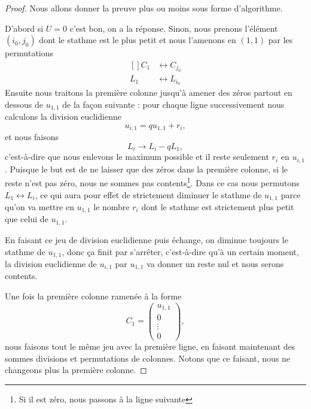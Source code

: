 \begin{proof}
	Nous allons donner la preuve plus ou moins sous forme d'algorithme.

	D'abord si \( U=0\) c'est bon, on a la réponse. Sinon, nous prenons l'élément \( (i_0,j_0)\) dont le stathme est le plus petit et nous l'amenons en \( (1,1)\) par les permutations
	\begin{equation}
		\begin{aligned}[]
			C_1 & \leftrightarrow C_{j_0} \\
			L_1 & \leftrightarrow L_{i_0}
		\end{aligned}
	\end{equation}
	Ensuite nous traitons la première colonne jusqu'à amener des zéros partout en dessous de \( u_{1,1}\) de la façon suivante : pour chaque ligne successivement nous calculons la division euclidienne
	\begin{equation}
		u_{i,1}=qu_{1,1}+r_i,
	\end{equation}
	et nous faisons
	\begin{equation}
		L_i\to L_i-qL_1,
	\end{equation}
	c'est-à-dire que nous enlevons le maximum possible et il reste seulement \( r_i\) en \( u_{i,1}\). Puisque le but est de ne laisser que des zéros dans la première colonne, si le reste n'est pas zéro, nous ne sommes pas contents\footnote{Si il est zéro, nous passons à la ligne suivante}. Dans ce cas nous permutons \( L_1\leftrightarrow L_i\), ce qui aura pour effet de strictement diminuer le stathme de \( u_{1,1}\) parce qu'on va mettre en \( u_{1,1}\) le nombre \( r_i\) dont le stathme est strictement plus petit que celui de \( u_{1,1}\).

	En faisant ce jeu de division euclidienne puis échange, on diminue toujours le stathme de \( u_{1,1}\), donc ça finit par s'arrêter, c'est-à-dire qu'à un certain moment, la division euclidienne de \( u_{i,1}\) par \( u_{1,1}\) va donner un reste nul et nous serons contents.

	Une fois la première colonne ramenée à la forme
	\begin{equation}
		C_1=\begin{pmatrix}
			u_{1,1} \\
			0      \\
			\vdots \\
			0
		\end{pmatrix},
	\end{equation}
	nous faisons tout le même jeu avec la première ligne, en faisant maintenant des sommes divisions et permutations de colonnes. Notons que ce faisant, nous ne changeons plus la première colonne.


\end{proof}
